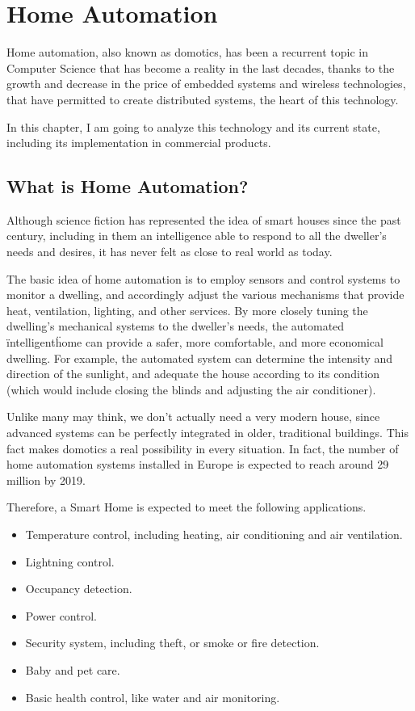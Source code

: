 \chapter{Home Automation}

Home automation, also known as domotics, has been a recurrent topic in Computer Science that
has become a reality in the last decades, thanks to the growth and decrease in the price of embedded
systems and wireless technologies, that have permitted to create distributed systems, the heart of this technology.

In this chapter, I am going to analyze this technology and its current state, including its implementation in commercial
products.

\section{What is Home Automation?}
Although science fiction has represented the idea of smart houses since the past century, including in them
an intelligence able to respond to all the dweller’s needs and desires, it has never felt as close to real world as today.

The basic idea of home automation is to employ sensors and control systems to monitor a dwelling, and accordingly 
adjust the various mechanisms that provide heat, ventilation, lighting, and other services. By more closely tuning the 
dwelling’s mechanical systems to the dweller’s needs, the automated \"intelligent\" home can provide a safer, more 
comfortable, and more economical dwelling.\cite{smarthouse98} For example, the automated system can determine 
the intensity and direction of the sunlight, and adequate the house according to its condition (which would include
closing the blinds and adjusting the air conditioner).

Unlike many may think, we don't actually need a very modern house, since advanced systems can be perfectly integrated 
in older, traditional buildings. This fact makes domotics a real possibility in every situation. In fact, the number of home 
automation systems installed in Europe is expected to reach around 29 million by 2019.\cite{statistaInstalled}

Therefore, a Smart Home is expected to meet the following applications.
\begin{itemize}
	\item Temperature control, including heating, air conditioning and air ventilation.
	\item Lightning control.
	\item Occupancy detection.
	\item Power control.
	\item Security system, including theft, or smoke or fire detection.
	\item Baby and pet care.
	\item Basic health control, like water and air monitoring.
\end{itemize}

